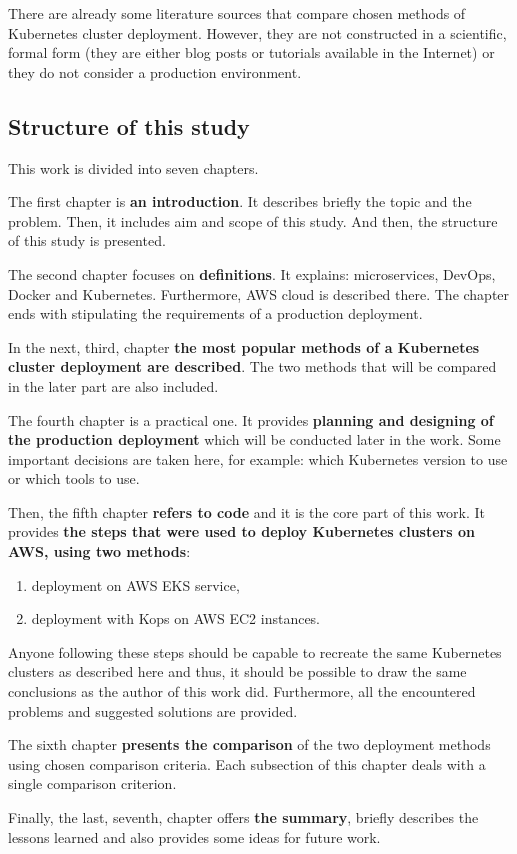 There are already some literature sources that compare chosen methods of Kubernetes cluster deployment. However, they are not constructed in a scientific, formal form (they are either blog posts or tutorials available in the Internet) or they do not consider a production environment.

\subsection{Structure of this study}

This work is divided into seven chapters.

The first chapter is \textbf{an introduction}. It describes briefly the topic and the problem. Then, it includes aim and scope of this study. And then, the structure of this study is presented.

The second chapter focuses on \textbf{definitions}. It explains: microservices, DevOps, Docker and Kubernetes. Furthermore, AWS cloud is described there. The chapter ends with stipulating the requirements of a production deployment.

In the next, third, chapter \textbf{the most popular methods of a Kubernetes cluster deployment are described}. The two methods that will be compared in the later part are also included.

The fourth chapter is a practical one. It provides \textbf{planning and designing of the production deployment} which will be conducted later in the work. Some important decisions are taken here, for example: which Kubernetes version to use or which tools to use.

Then, the fifth chapter \textbf{refers to code} and it is the core part of this work. It provides \textbf{the steps that were used to deploy Kubernetes clusters on AWS, using two methods}:
\begin{enumerate}
\item deployment on AWS EKS service,
\item deployment with Kops on AWS EC2 instances.
\end{enumerate}
Anyone following these steps should be capable to recreate the same Kubernetes clusters as described here and thus, it should be possible to draw the same conclusions as the author of this work did. Furthermore, all the encountered problems and suggested solutions are provided.

The sixth chapter \textbf{presents the comparison} of the two deployment methods using chosen comparison criteria. Each subsection of this chapter deals with a single comparison criterion.

Finally, the last, seventh, chapter offers \textbf{the summary}, briefly describes the lessons learned and also provides some ideas for future work.
